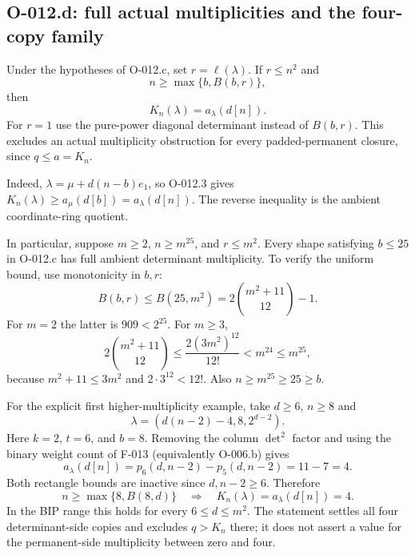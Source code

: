 \subsection{O-012.d: full actual multiplicities and the four-copy family}

Under the hypotheses of O-012.c, set $r=\ell(\lambda)$.
If $r\leq n^2$ and
\[
                          n\geq\max\{b,B(b,r)\},       \tag{O-012.5}
\]
then
\[
                         K_n(\lambda)=a_\lambda(d[n]). \tag{O-012.6}
\]
For $r=1$ use the pure-power diagonal determinant instead of
$B(b,r)$. This excludes an actual multiplicity obstruction for
every padded-permanent closure, since $q\leq a=K_n$.

Indeed, $\lambda=\mu+d(n-b)e_1$, so O-012.3 gives
$K_n(\lambda)\geq a_\mu(d[b])=a_\lambda(d[n])$.
The reverse inequality is the ambient coordinate-ring quotient.

In particular, suppose $m\geq2$, $n\geq m^{25}$, and
$r\leq m^2$. Every shape satisfying $b\leq25$ in O-012.c
has full ambient determinant multiplicity. To verify the uniform
bound, use monotonicity in $b,r$:
\[
 B(b,r)\leq B(25,m^2)=2\binom{m^2+11}{12}-1.
\]
For $m=2$ the latter is $909<2^{25}$. For $m\geq3$,
\[
 2\binom{m^2+11}{12}
  \leq\frac{2(3m^2)^{12}}{12!}
  <m^{24}\leq m^{25},
\]
because $m^2+11\leq3m^2$ and $2\cdot3^{12}<12!$.
Also $n\geq m^{25}\geq25\geq b$.

For the explicit first higher-multiplicity example, take $d\geq6$,
$n\geq8$ and
\[
               \lambda=(d(n-2)-4,8,2^{d-2}).
\]
Here $k=2$, $t=6$, and $b=8$. Removing the column
$\det^2$ factor and using the binary weight count of F-013
(equivalently O-006.b) gives
\[
 a_\lambda(d[n])=p_6(d,n-2)-p_5(d,n-2)=11-7=4.
\]
Both rectangle bounds are inactive since $d,n-2\geq6$.
Therefore
\[
       n\geq\max\{8,B(8,d)\}\quad\Longrightarrow\quad
                         K_n(\lambda)=a_\lambda(d[n])=4. \tag{O-012.7}
\]
In the BIP range this holds for every $6\leq d\leq m^2$.
The statement settles all four determinant-side copies and
excludes $q>K_n$ there; it does not assert a value for the
permanent-side multiplicity between zero and four.


